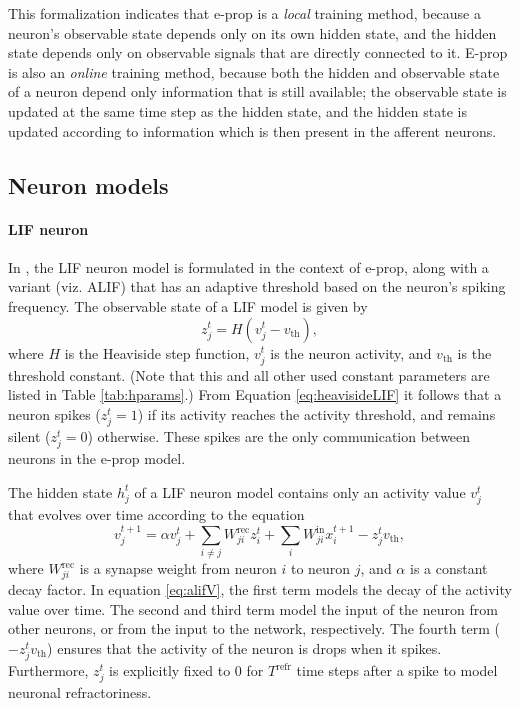         This formalization indicates that e-prop is a \emph{local} training method, because a neuron's observable state depends only on its own hidden state, and the hidden state depends only on observable signals that are directly connected to it.
        E-prop is also an \emph{online} training method, because both the hidden and observable state of a neuron depend only information that is still available; the observable state is updated at the same time step as the hidden state, and the hidden state is updated according to information which is then present in the afferent neurons.

    \subsection{Neuron models}\label{sec:alif}

        \paragraph{LIF neuron}
            In \citet{bellec2020solution}, the LIF neuron model is formulated in the context of e-prop, along with a variant (viz. ALIF) that has an adaptive threshold based on the neuron's spiking frequency.
            The observable state of a LIF model is given by
            \begin{equation}\label{eq:heavisideLIF}
            z^t_j = H\left(v_j^t-v_\text{th}\right),
            \end{equation}
            where $H$ is the Heaviside step function, $v^t_j$ is the neuron activity, and $v_\text{th}$ is the threshold constant.
            (Note that this and all other used constant parameters are listed in Table \ref{tab:hparams}.)
            From Equation \ref{eq:heavisideLIF} it follows that a neuron spikes ($z^t_j = 1$) if its activity reaches the activity threshold, and remains silent ($z^t_j = 0$) otherwise.
            These spikes are the only communication between neurons in the e-prop model.

            The hidden state $h^t_j$ of a LIF neuron model contains only an activity value $v^t_j$ that evolves over time according to the equation
            \begin{equation}\label{eq:alifV}
            v^{t+1}_j = \alpha v_j^t + \sum_{i\neq j}W^\text{rec}_{ji}z_i^t + \sum_i W^\text{in}_{ji}x_i^{t+1} - z_j^tv_
            \text{th},
            \end{equation}
            where $W^\text{rec}_{ji}$ is a synapse weight from neuron $i$ to neuron $j$, and $\alpha$ is a constant decay factor.
            In equation \ref{eq:alifV}, the first term models the decay of the activity value over time.
            The second and third term model the input of the neuron from other neurons, or from the input to the network, respectively.
            The fourth term ($-z^t_jv_\text{th}$) ensures that the activity of the neuron is drops when it spikes.
            Furthermore, $z^t_j$ is explicitly fixed to 0 for $T^\text{refr}$ time steps after a spike to model neuronal refractoriness.

